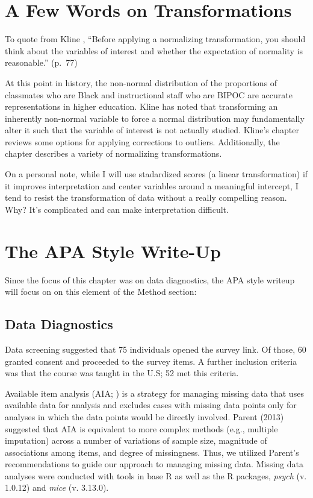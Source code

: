 \documentclass[
  11pt,
]{book}
\begin{document}
\hypertarget{a-few-words-on-transformations}{%
\section{A Few Words on Transformations}\label{a-few-words-on-transformations}}

To quote from Kline \citeyearpar{kline_principles_2016}, ``Before applying a normalizing transformation, you should think about the variables of interest and whether the expectation of normality is reasonable.'' (p.~77)

At this point in history, the non-normal distribution of the proportions of classmates who are Black and instructional staff who are BIPOC are accurate representations in higher education. Kline \citeyearpar{kline_principles_2016} has noted that transforming an inherently non-normal variable to force a normal distribution may fundamentally alter it such that the variable of interest is not actually studied. Kline's chapter reviews some options for applying corrections to outliers. Additionally, the chapter describes a variety of normalizing transformations.

On a personal note, while I will use stadardized scores (a linear transformation) if it improves interpretation and center variables around a meaningful intercept, I tend to resist the transformation of data without a really compelling reason. Why? It's complicated and can make interpretation difficult.

\hypertarget{the-apa-style-write-up-1}{%
\section{The APA Style Write-Up}\label{the-apa-style-write-up-1}}

Since the focus of this chapter was on data diagnostics, the APA style writeup will focus on on this element of the Method section:

\hypertarget{data-diagnostics}{%
\subsection{Data Diagnostics}\label{data-diagnostics}}

Data screening suggested that 75 individuals opened the survey link. Of those, 60 granted consent and proceeded to the survey items. A further inclusion criteria was that the course was taught in the U.S; 52 met this criteria.

Available item analysis (AIA; \citep{parent_handling_2013}) is a strategy for managing missing data that uses available data for analysis and excludes cases with missing data points only for analyses in which the data points would be directly involved. Parent (2013) suggested that AIA is equivalent to more complex methods (e.g., multiple imputation) across a number of variations of sample size, magnitude of associations among items, and degree of missingness. Thus, we utilized Parent's recommendations to guide our approach to managing missing data. Missing data analyses were conducted with tools in base R as well as the R packages, \emph{psych} (v. 1.0.12) and \emph{mice} (v. 3.13.0).
\end{document}
